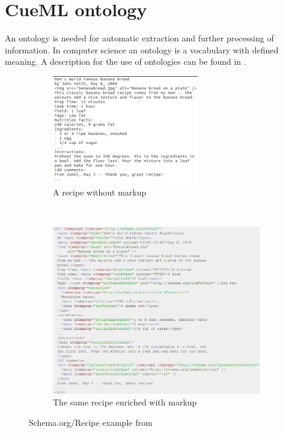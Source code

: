 \documentclass[12pt, twoside]{report}
\begin{document}
\section{CueML ontology}\label{sec:cueMLOntology}
An ontology is needed for automatic extraction and further processing of information. In computer science an ontology is a vocabulary with defined meaning. A description for the use of ontologies can be found in \parencite{semanticWeb}.

\begin{figure}
	\begin{subfigure}{1\textwidth}
		\centering
		\includegraphics[width=0.7\textwidth]{Images/schemaRecipeWithoutMarkup}
		\caption{A recipe without markup}\vspace{1em}
	\end{subfigure} \\
	\begin{subfigure}{1\textwidth}
		\centering
		\includegraphics[width=1\textwidth]{Images/schemaRecipeWithMarkup}
		\caption{The same recipe enriched with markup}
	\end{subfigure}
	\caption{Schema.org/Recipe example from \parencite{schemaOrg}}
	\label{fig:schemaOrgRecipe}
\end{figure}
\end{document}
